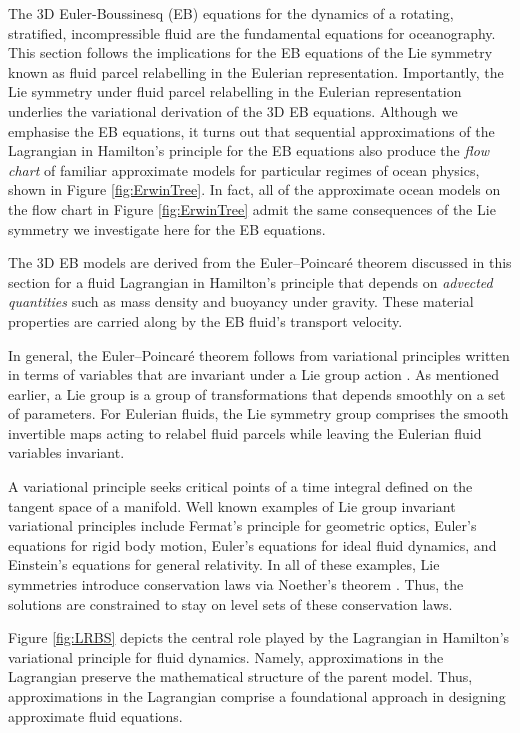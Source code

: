 \documentclass[11pt, oneside]{article}   	%
\numberwithin{equation}{section}
\theoremstyle{plain}
\theoremstyle{definition}
\theoremstyle{remark}
\newcommand{\<}{\langle}
\renewcommand{\>}{\rangle}
\begin{document}
The 3D Euler-Boussinesq (EB) equations for the dynamics of a rotating, stratified, incompressible fluid are the fundamental equations for oceanography. 
This section follows the implications for the EB equations of the Lie symmetry known as fluid parcel relabelling in the Eulerian representation. Importantly, the Lie symmetry under fluid parcel relabelling in the Eulerian representation underlies the variational derivation of the 3D EB equations. Although we emphasise the EB equations, it turns out that sequential approximations of the Lagrangian in Hamilton's principle for the EB equations also produce the \emph{flow chart} of familiar approximate models for particular regimes of ocean physics, shown in Figure \ref{fig:ErwinTree}. 
In fact, all of the approximate ocean models on the flow chart in Figure \ref{fig:ErwinTree} admit the same consequences of the Lie symmetry we investigate here for the EB equations.

The 3D EB models are derived from the Euler--Poincar\'e theorem discussed in this section for a fluid Lagrangian in Hamilton's principle that depends 
on \emph{advected quantities} such as mass density and buoyancy under gravity. These material properties
are carried along by the EB fluid's transport velocity.   

In general, the Euler--Poincar\'e theorem follows from variational principles written in terms of variables that are invariant under a Lie group action \cite{HMR1998}.  As mentioned earlier, a Lie group is a group of transformations that depends smoothly on a set of parameters. For Eulerian fluids, the Lie symmetry group comprises the smooth invertible maps acting to relabel fluid parcels while leaving the Eulerian fluid variables invariant. 

A variational principle seeks critical points of a time integral defined on the tangent space of a manifold. Well known examples of Lie group invariant variational principles include Fermat's principle for geometric optics, Euler's equations for rigid body motion, Euler's equations for ideal fluid dynamics, and Einstein's equations for general relativity. In all of these examples, Lie symmetries introduce conservation laws via Noether's theorem \cite{noether1983invariante}. Thus, the solutions are constrained to stay on level sets of these conservation laws.

Figure \ref{fig:LRBS} depicts the central role played by the Lagrangian in Hamilton's variational principle for fluid dynamics. Namely, approximations in the Lagrangian preserve the mathematical structure of the parent model. Thus, approximations in the Lagrangian comprise a foundational approach in designing approximate fluid equations. 
 
\end{document}
